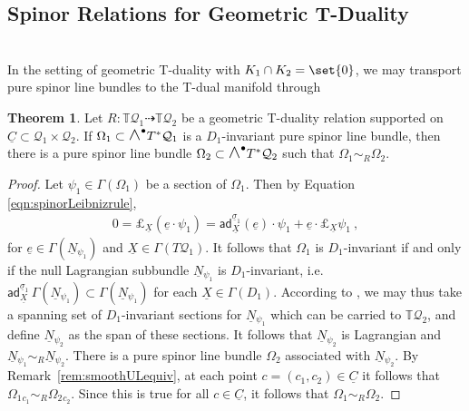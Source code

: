 \documentclass[a4paper, reqno, 11pt]{amsart}
\numberwithin{equation}{section}
\theoremstyle{definition}
\newtheorem{theorem}[equation]{Theorem}
\newcommand{\sfgamma}{\mathsf{\Gamma}}
\newcommand{\red}[1]{\underline{#1}}
\newcommand{\IT}{\mathbb{T}}
\newcommand{\cQ}{{\mathcal Q}}
\newcommand{\midwedge}{\text {\Large$\wedge$}}
\theoremstyle{remark}
\begin{document}
\medskip

\subsection{Spinor Relations for Geometric T-Duality}~\\[5pt] \label{ssec:SpinorrelationTduality}
In the setting of geometric T-duality with $K_1\cap K_2 = \set{0}$, we may transport pure spinor line bundles to the T-dual manifold through

\begin{theorem}\label{thm:relatedspinorline}
    Let $R \colon \mathbb{T} \mathcal{Q}_1 \dashrightarrow \mathbb{T} \mathcal{Q}_2$ be a geometric T-duality relation supported on $\red C \subset \cQ_1 \times \cQ_2$. If $\Omega_1 \subset \midwedge^\bullet T^*\cQ_1$ is a $D_1$-invariant pure spinor line bundle, then there is a pure spinor line bundle $\Omega_2 \subset \midwedge^\bullet T^* \cQ_2$ such that $\Omega_1\sim_{R} \Omega_2$.
\end{theorem}

\begin{proof}
    Let $\psi_1 \in \sfgamma(\Omega_1)$ be a section of $\Omega_1$. Then by Equation \eqref{eqn:spinorLeibnizrule},
    \begin{align}
        0=\pounds_{\red X} (\red e \cdot \psi_1) = \mathsf{ad}^{\red\sigma_1}_{\red X}(\red e) \cdot \psi_1 + \red e \cdot \pounds_{\red X} \psi_1 \ ,
    \end{align}
for $\red e \in \sfgamma(\red N{}_{\psi_1})$ and $\red X \in \sfgamma(T\cQ_1)$.  It follows that $\Omega_1$ is $D_1$-invariant if and only if the null Lagrangian subbundle $\red N{}_{\psi_1}$ is $D_1$-invariant, i.e. $\mathsf{ad}^{\red\sigma_1}_{\red X}\, \sfgamma(\red N{}_{\psi_1}) \subset \sfgamma(\red N{}_{\psi_1})$ for each $\red X \in \sfgamma(D_1)$. According to \cite[Lemma 3.32]{deFraja2025Ricci}, we may thus take a spanning set of $D_1$-invariant sections for $\red N{}_{\psi_1}$ which can be carried to $\IT\cQ_2$, and define $\red N{}_{\psi_2}$ as the span of these sections. It follows that $\red N{}_{\psi_2}$ is Lagrangian and $\red N{}_{\psi_1}\sim_R \red N{}_{\psi_2}$. There is a pure spinor line bundle $\Omega_2$ associated with $\red N{}_{\psi_2}$. 
    By Remark~\ref{rem:smoothULequiv}, at each point $c = (c_1, c_2)\in \red C$ it follows that $\Omega_1{}_{c_1} \sim_R \Omega_2{}_{c_2}$. Since this is true for all $c\in \red C$, it follows that $\Omega_1\sim_R \Omega_2$.
\end{proof}
\end{document}
